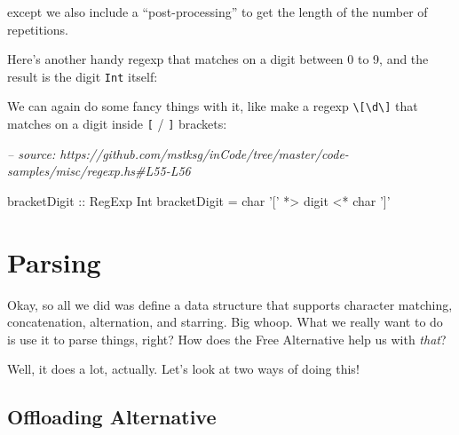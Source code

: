 \documentclass[]{article}
\newenvironment{Shaded}{}{}
\newcommand{\CharTok}[1]{\textcolor[rgb]{0.25,0.44,0.63}{#1}}
\newcommand{\CommentTok}[1]{\textcolor[rgb]{0.38,0.63,0.69}{\textit{#1}}}
\newcommand{\DataTypeTok}[1]{\textcolor[rgb]{0.56,0.13,0.00}{#1}}
\newcommand{\DecValTok}[1]{\textcolor[rgb]{0.25,0.63,0.44}{#1}}
\newcommand{\FunctionTok}[1]{\textcolor[rgb]{0.02,0.16,0.49}{#1}}
\newcommand{\NormalTok}[1]{#1}
\newcommand{\OtherTok}[1]{\textcolor[rgb]{0.00,0.44,0.13}{#1}}
\begin{document}
except we also include a ``post-processing'' to get the length of the number of
repetitions.

Here's another handy regexp that matches on a digit between 0 to 9, and the
result is the digit \texttt{Int} itself:

\begin{Shaded}
\end{Shaded}

We can again do some fancy things with it, like make a regexp
\texttt{\textbackslash{}{[}\textbackslash{}d\textbackslash{}{]}} that matches on
a digit inside \texttt{{[}} / \texttt{{]}} brackets:

\begin{Shaded}
\begin{Highlighting}[]
\CommentTok{-- source: https://github.com/mstksg/inCode/tree/master/code-samples/misc/regexp.hs#L55-L56}

\OtherTok{bracketDigit ::} \DataTypeTok{RegExp} \DataTypeTok{Int}
\NormalTok{bracketDigit }\FunctionTok{=}\NormalTok{ char }\CharTok{'['} \FunctionTok{*>}\NormalTok{ digit }\FunctionTok{<*}\NormalTok{ char }\CharTok{']'}
\end{Highlighting}
\end{Shaded}

\hypertarget{parsing}{%
\section{Parsing}\label{parsing}}

Okay, so all we did was define a data structure that supports character
matching, concatenation, alternation, and starring. Big whoop. What we really
want to do is use it to parse things, right? How does the Free Alternative help
us with \emph{that}?

Well, it does a lot, actually. Let's look at two ways of doing this!

\hypertarget{offloading-alternative}{%
\subsection{Offloading Alternative}\label{offloading-alternative}}
\end{document}
